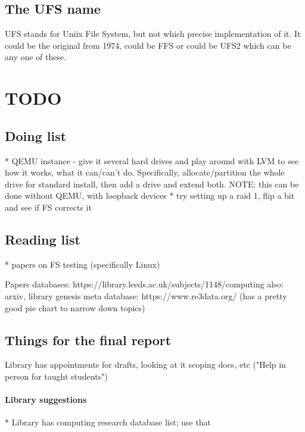 \documentclass[a4paper]{report}
\begin{document}
    \subsection{The UFS name}

        UFS stands for Uniix File System, but not which precise implementation
        of it. It could be the original from 1974, could be FFS or could be
        UFS2 which can be any one of these.


\section{TODO}

    \subsection{Doing list}
        * QEMU instance
            - give it several hard drives and play around with LVM to see how
            it works, what it can/can't do. Specifically, allocate/partition
            the whole drive for standard install, then add a drive and extend
            both. NOTE: this can be done without QEMU, with loopback devices
        * try setting up a raid 1, flip a bit and see if FS corrects it

    \subsection{Reading list}
        * papers on FS testing (specifically Linux)

        Papers databases: https://library.leeds.ac.uk/subjects/1148/computing
        also: arxiv, library genesis
        meta database: https://www.re3data.org/ (has a pretty good pie chart to narrow down topics)

    \subsection{Things for the final report}
        Library has appointments for drafts, looking at it scoping docs, etc ("Help in person for taught students")
        \paragraph{Library suggestions}
        * Library has computing research database list; use that
\end{document}

